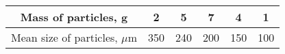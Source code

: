 \begin{center}
\begin{tabular}{|c|c|c|c|c|c|}
\hline
Mass of particles, g      & 2   & 5   & 7   & 4   & 1    \\
\hline
Mean size of particles, $\mu$m & 350 & 240 & 200 & 150 & 100 \\
\hline
\end{tabular}
\end{center}